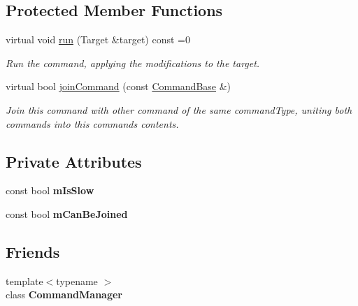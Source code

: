 \subsection*{Protected Member Functions}
\begin{DoxyCompactItemize}
\item 
\mbox{\label{classpepr3d_1_1_command_base_a6943d010f181040692b0f023dbfc81e1}} 
virtual void \mbox{\hyperlink{classpepr3d_1_1_command_base_a6943d010f181040692b0f023dbfc81e1}{run}} (Target \&target) const =0
\begin{DoxyCompactList}\small\item\em Run the command, applying the modifications to the target. \end{DoxyCompactList}\item 
virtual bool \mbox{\hyperlink{classpepr3d_1_1_command_base_a9ef408154b7cb446e626e049f268abb4}{join\+Command}} (const \mbox{\hyperlink{classpepr3d_1_1_command_base}{Command\+Base}} \&)
\begin{DoxyCompactList}\small\item\em Join this command with other command of the same command\+Type, uniting both commands into this command\textquotesingle{}s contents. \end{DoxyCompactList}\end{DoxyCompactItemize}
\subsection*{Private Attributes}
\begin{DoxyCompactItemize}
\item 
\mbox{\label{classpepr3d_1_1_command_base_a884c50fcc57fef5c64963477439d911d}} 
const bool {\bfseries m\+Is\+Slow}
\item 
\mbox{\label{classpepr3d_1_1_command_base_a16abc671f463d91822c85dfd7046ad77}} 
const bool {\bfseries m\+Can\+Be\+Joined}
\end{DoxyCompactItemize}
\subsection*{Friends}
\begin{DoxyCompactItemize}
\item 
\mbox{\label{classpepr3d_1_1_command_base_ae3e7ab088f3b4445fdc4a599562f325a}} 
{\footnotesize template$<$typename $>$ }\\class {\bfseries Command\+Manager}
\end{DoxyCompactItemize}


